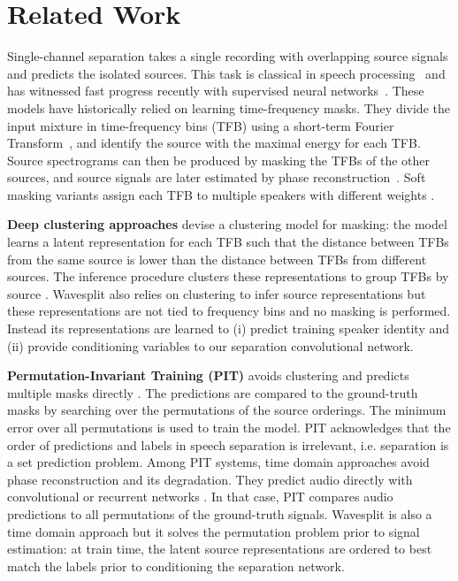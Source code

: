 \documentclass[letterpaper, onecolumn,10 pt]{IEEEtran}
\begin{document}
\section{Related Work}
\label{sec:related}

Single-channel separation takes a single recording with overlapping source signals and predicts the isolated sources. This task is classical in speech processing~\cite{roweis01:one_mic,yilmaz04:blind,vincent18book} and has witnessed fast progress recently with supervised neural networks~\cite{wang18:overview}. These models have historically relied on learning time-frequency masks. They divide the input mixture in time-frequency bins (TFB) using a short-term Fourier Transform~\cite{williamson12:DSP}, and identify the source with the maximal energy for each TFB. Source spectrograms can then be produced by masking the TFBs of the other sources, and source signals are later estimated by phase reconstruction~\cite{griffinlim84,wang18:unfolded}. Soft masking variants assign each TFB to multiple speakers with different weights \cite{araki04:continuousmask}.
 
 {\bf Deep clustering approaches} devise a clustering model for masking: the model learns a latent representation for each TFB such that the distance between TFBs from the same source is lower than the distance between TFBs from different sources. The inference procedure clusters these representations to group TFBs by source \cite{hershey16:deep_clustering}. Wavesplit also relies on clustering to infer source representations but these representations are not tied to frequency bins and no masking is performed. Instead its representations are learned to (i) predict training speaker identity and (ii) provide conditioning variables to our separation convolutional network.

{\bf Permutation-Invariant Training (PIT)} avoids clustering and predicts multiple masks directly \cite{yu17:pit,kolbaek17:multitalker,xu18:pit}. The predictions are compared to the ground-truth masks by searching over the permutations of the source orderings. The minimum error over all permutations is used to train the model. PIT acknowledges that the order of predictions and labels in speech separation is irrelevant, i.e. separation is a set prediction problem. Among PIT systems, time domain approaches avoid phase reconstruction and its degradation. They predict audio directly with convolutional \cite{luo19:tasnet,zhang2020:furcanext} or recurrent networks \cite{luo2019:dualpathrnn}. In that case, PIT compares audio predictions to all permutations of the ground-truth signals. Wavesplit is also a time domain approach but it solves the permutation problem prior to signal estimation: at train time, the latent source representations are ordered to best match the labels prior to conditioning the separation network.
\end{document}
